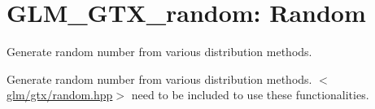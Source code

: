 \hypertarget{group__gtx__random}{\section{\-G\-L\-M\-\_\-\-G\-T\-X\-\_\-random\-: \-Random}
\label{group__gtx__random}
}


\-Generate random number from various distribution methods.  


\-Generate random number from various distribution methods. $<$\hyperlink{gtx_2random_8hpp}{glm/gtx/random.\-hpp}$>$ need to be included to use these functionalities. 